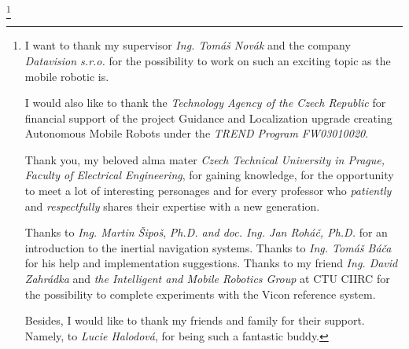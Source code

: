 \thanks {I want to thank my supervisor {\it Ing. Tomáš Novák} and the company {\it Datavision s.r.o.} for the possibility to work on such an exciting topic as the mobile robotic is.

I would also like to thank the {\it Technology Agency of the Czech Republic} for financial support of the project Guidance and Localization upgrade creating Autonomous Mobile Robots under the {\it TREND Program FW03010020}.

Thank you, my beloved alma mater {\it Czech Technical University in Prague, Faculty of Electrical Engineering}, for gaining knowledge, for the opportunity to meet a lot of interesting personages and for every professor who {\it patiently} and {\it respectfully} shares their expertise with a new generation.

Thanks to {\it Ing. Martin Šipoš}, {\it Ph.D. and doc. Ing. Jan Roháč, Ph.D.} for an introduction to the inertial navigation systems.
Thanks to {\it Ing. Tomáš Báča} for his help and implementation suggestions.
Thanks to my friend {\it Ing. David Zahrádka} and {\it the Intelligent and Mobile Robotics Group} at CTU CIIRC for the possibility to complete experiments with the Vicon reference system.

Besides, I would like to thank my friends and family for their support. Namely, to {\it Lucie Halodová}, for being such a fantastic buddy.}

\makefront



% 















\bye
